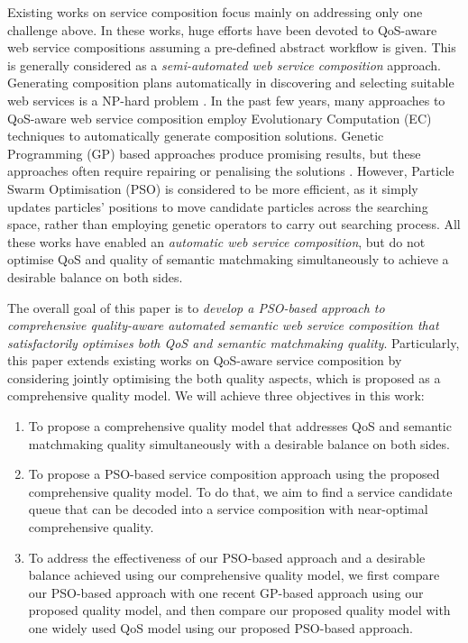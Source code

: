 \documentclass{llncs}
\begin{document}
Existing works on service composition focus mainly on addressing only one challenge above. In these works, huge efforts have been devoted to QoS-aware web service compositions assuming a pre-defined abstract workflow is given. This is generally considered as a \textit{semi-automated web service composition} approach. Generating composition plans automatically in discovering and selecting suitable web services is a NP-hard problem \cite{moghaddam2014service}. In the past few years, many approaches \cite{gupta2015optimization,ma2015hybrid,qi2010combining,da2016particle,da2015graphevol,yu2013adaptive} to QoS-aware web service composition employ Evolutionary Computation (EC) techniques to automatically generate composition solutions. Genetic Programming (GP) based approaches produce promising results, but these approaches often require repairing or penalising the solutions \cite{ma2015hybrid,yu2013adaptive}. However, Particle Swarm Optimisation (PSO) is considered to be more efficient, as it simply updates particles' positions to move candidate particles across the searching space, rather than employing genetic operators to carry out searching process. All these works have enabled an \textit{automatic web service composition}, but do not optimise QoS and quality of semantic matchmaking simultaneously to achieve a desirable balance on both sides.  

The overall goal of this paper is to \textit{develop a PSO-based approach to comprehensive quality-aware automated semantic web service composition that satisfactorily optimises both QoS and semantic matchmaking quality}. Particularly, this paper extends existing works on QoS-aware service composition by considering jointly optimising the both quality aspects, which is proposed as a comprehensive quality model. We will achieve three objectives in this work:

\begin{enumerate}
 \item To propose a comprehensive quality model that addresses QoS and semantic matchmaking quality simultaneously with a desirable balance on both sides.
  
 \item To propose a PSO-based service composition approach using the proposed comprehensive quality model. To do that, we aim to find a service candidate queue that can be decoded into a service composition with near-optimal comprehensive quality.  
 \item To address the effectiveness of our PSO-based approach and a desirable balance achieved using our comprehensive quality model, we first compare our PSO-based approach with one recent GP-based approach \cite{ma2015hybrid} using our proposed quality model, and then compare our proposed quality model with one widely used QoS model using our proposed PSO-based approach.
\end{enumerate}
\vspace{-0.5cm}
\end{document}
